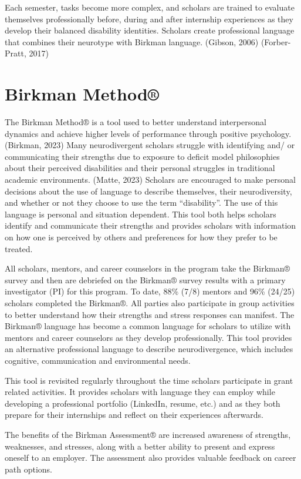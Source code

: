 \documentclass[11.5pt]{sig-alternate}
\begin{document}
\begin{large}
Each semester, tasks become more complex, and scholars are trained to evaluate themselves professionally before, during and after internship experiences as they develop their balanced disability identities. Scholars create professional language that combines their neurotype with Birkman language. (Gibson, 2006) (Forber-Pratt, 2017)

\section*{Birkman Method®}

The Birkman Method® is a tool used to better understand interpersonal dynamics and achieve higher levels of performance through positive psychology. (Birkman, 2023) Many neurodivergent scholars struggle with identifying and/ or communicating their strengths due to exposure to deficit model philosophies about their perceived disabilities and their personal struggles in traditional academic environments. (Matte, 2023) Scholars are encouraged to make personal decisions about the use of language to describe themselves, their neurodiversity, and whether or not they choose to use the term “disability”. The use of this language is personal and situation dependent. This tool both helps scholars identify and communicate their strengths and provides scholars with information on how one is perceived by others and preferences for how they prefer to be treated.

All scholars, mentors, and career counselors in the program take the Birkman® survey and then are debriefed on the Birkman® survey results with a primary investigator (PI) for this program. To date, 88\% (7/8) mentors and 96\% (24/25) scholars completed the Birkman®. All parties also participate in group activities to better understand how their strengths and stress responses can manifest. The Birkman® language has become a common language for scholars to utilize with mentors and career counselors as they develop professionally. This tool provides an alternative professional language to describe neurodivergence, which includes cognitive, communication and environmental needs.

This tool is revisited regularly throughout the time scholars participate in grant related activities. It provides scholars with language they can employ while developing a professional portfolio (LinkedIn, resume, etc.) and as they both prepare for their internships and reflect on their experiences afterwards.

The benefits of the Birkman Assessment® are increased awareness of strengths, weaknesses, and stresses, along with a better ability to present and express oneself to an employer. The assessment also provides valuable feedback on career path options.


\end{large}
\end{document}
